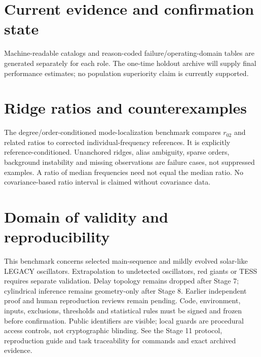 \documentclass[11pt]{article}
\begin{document}
\section{Current evidence and confirmation state}

\par\medskip
Machine-readable catalogs and reason-coded failure/operating-domain tables are
generated separately for each role. The one-time holdout archive will supply final
performance estimates; no population superiority claim is currently supported.
\section{Ridge ratios and counterexamples}
The degree/order-conditioned mode-localization benchmark compares $r_{02}$ and
related ratios to corrected individual-frequency references. It is explicitly
reference-conditioned. Unanchored ridges, alias ambiguity, sparse orders,
background instability and missing observations are failure cases, not suppressed
examples. A ratio of median frequencies need not equal the median ratio.
No covariance-based ratio interval is claimed without covariance data.
\section{Domain of validity and reproducibility}
This benchmark concerns selected main-sequence and mildly evolved solar-like
LEGACY oscillators. Extrapolation to undetected oscillators, red giants or TESS
requires separate validation. Delay topology remains dropped after Stage 7;
cylindrical inference remains geometry-only after Stage 8. Earlier independent
proof and human reproduction reviews remain pending. Code, environment, inputs,
exclusions, thresholds and statistical rules must be signed and frozen before
confirmation. Public identifiers are visible; local guards are procedural access
controls, not cryptographic blinding. See the Stage 11 protocol, reproduction
guide and task traceability for commands and exact archived evidence.

\end{document}
